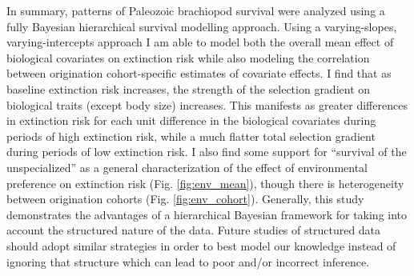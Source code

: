 \documentclass[12pt,letterpaper]{article}
\begin{document}
In summary, patterns of Paleozoic brachiopod survival were analyzed using a fully Bayesian hierarchical survival modelling approach. Using a varying-slopes, varying-intercepts approach I am able to model both the overall mean effect of biological covariates on extinction risk while also modeling the correlation between origination cohort-specific estimates of covariate effects. I find that as baseline extinction risk increases, the strength of the selection gradient on biological traits (except body size) increases. This manifests as greater differences in extinction risk for each unit difference in the biological covariates during periods of high extinction risk, while a much flatter total selection gradient during periods of low extinction risk. I also find some support for ``survival of the unspecialized'' \citep{Simpson1944,Liow2004a,Liow2007b,Nurnberg2013a,Nurnberg2015} as a general characterization of the effect of environmental preference on extinction risk (Fig. \ref{fig:env_mean}), though there is heterogeneity between origination cohorts (Fig. \ref{fig:env_cohort}). Generally, this study demonstrates the advantages of a hierarchical Bayesian framework for taking into account the structured nature of the data. Future studies of structured data should adopt similar strategies in order to best model our knowledge instead of ignoring that structure which can lead to poor and/or incorrect inference.
\end{document}
